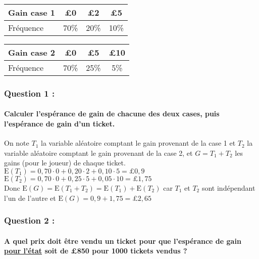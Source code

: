 \documentclass[a4paper, 12pt]{article}
\begin{document}
\begin{center}
\begin{tabular}{ |l|c|c|c| }
    \hline
    Gain case 1 & £0 & £2 & £5 \\
    \hline
    Fréquence & 70\% & 20\% & 10\% \\
    \hline
\end{tabular}
\hspace{1cm}
\begin{tabular}{ |l|c|c|c| }
    \hline
    Gain case 2 & £0 & £5 & £10 \\
    \hline
    Fréquence & 70\% & 25\% & 5\% \\
    \hline
\end{tabular}
\end{center}

{}
\subsubsection*{Question 1 :}
\paragraph*{Calculer l'espérance de gain de chacune des deux cases, puis l'espérance de gain d'un ticket.\\[5mm]}

On note $T_1$ la variable aléatoire comptant le gain provenant de la case 1 et $T_2$ la variable aléatoire comptant le gain provenant de la case 2, 
et $G = T_1 + T_2$ les gains (pour le joueur) de chaque ticket.
\\
$\text{E}(T_1) = 0,70 \cdot 0 + 0,20 \cdot 2 + 0,10 \cdot 5 = \pounds 0,9$ \\
$\text{E}(T_2) = 0,70 \cdot 0 + 0,25 \cdot 5 + 0,05 \cdot 10 = \pounds 1,75$ \\
Donc $\text{E}(G) = \text{E}(T_1 + T_2) = \text{E}(T_1) + \text{E}(T_2)$ car $T_1$ et $T_2$ sont indépendant l'un de l'autre et $\text{E}(G) = 0,9 + 1,75 = \pounds 2,65$

{}
\subsubsection*{Question 2 :}
\paragraph*{A quel prix doit être vendu un ticket pour que l'espérance de gain \underline{pour l'état} soit de £850 pour 1000 tickets vendus ?\\[5mm]}
\end{document}

